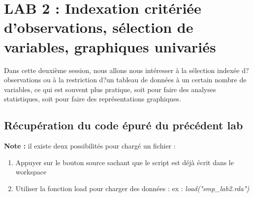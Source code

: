 \section{LAB 2 : Indexation critériée d'observations, sélection de variables, graphiques univariés}

Dans cette deuxième session, nous allons nous intéresser à la sélection indexée d?observations ou à la restriction d?un tableau de données à un certain nombre de variables, ce qui est souvent plus pratique, soit pour faire des analyses statistiques, soit pour faire des représentations graphiques.
\subsection*{Récupération du code épuré du précédent lab}
\textbf{Note : } il existe deux possibilités pour chargé un fichier : 
\begin{enumerate}
\item Appuyer sur le bouton source sachant que le script est déjà écrit dans le workspace
\item Utiliser la fonction load pour charger des données : ex : \textit{load("smp\_lab2.rda")}
\end{enumerate}

